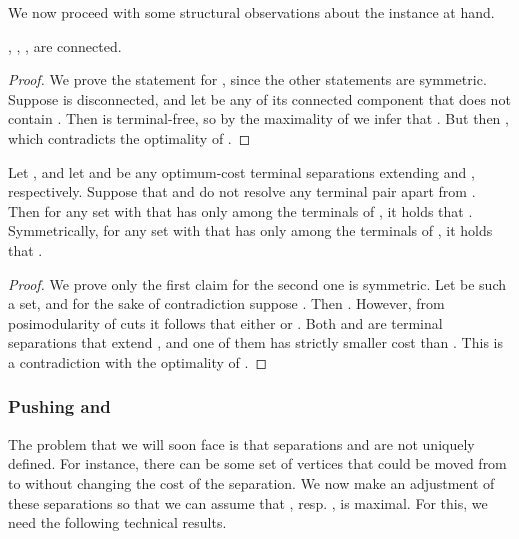 We now proceed with some structural observations about the instance at hand.

\begin{lemma}\label{lem:AsConn}
, , ,  are connected.
\end{lemma}
\begin{proof}
We prove the statement for , since the other statements are symmetric. Suppose  is disconnected, and let  be any of its connected component that does not contain . Then  is terminal-free, so by the maximality of  we infer that . But then , which contradicts the optimality of .
\end{proof}

\begin{lemma}\label{lem:lb}
Let , and let  and  be any optimum-cost terminal separations extending  and , respectively. Suppose that  and  do not resolve any terminal pair apart from . Then for any set  with  that has only  among the terminals of , it holds that . Symmetrically, for any set  with  that has only  among the terminals of , it holds that .
\end{lemma}
\begin{proof}
We prove only the first claim for the second one is symmetric. Let  be such a set, and for the sake of contradiction suppose . Then . However, from posimodularity of cuts it follows that either  or . Both  and  are terminal separations that extend , and one of them has strictly smaller cost than . This is a contradiction with the optimality of .
\end{proof}

\subsubsection{Pushing  and }

The problem that we will soon face is that separations  and  are not uniquely defined. For instance, there can be some set of vertices  that could be moved from  to  without changing the cost of the separation. We now make an adjustment of these separations so that we can assume that , resp. , is maximal. For this, we need the following technical results.

